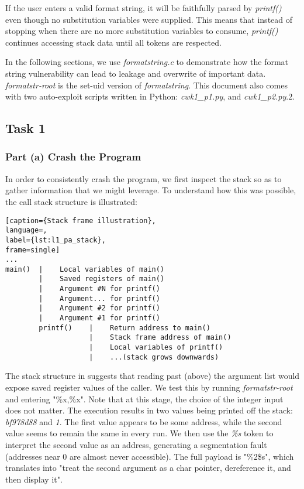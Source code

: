 If the user enters a valid format string, it will be faithfully parsed by \emph{printf()} even though no substitution variables were supplied. This means that instead of  stopping when there are no more substitution variables to consume, \emph{printf()} continues accessing stack data until all tokens are respected.

In the following sections, we use \emph{formatstring.c} to demonstrate how the format string vulnerability can lead to leakage and overwrite of important data. \emph{formatstr-root} is the set-uid version of \emph{formatstring}. This document also comes with two auto-exploit scripts written in Python: \emph{cwk1\_p1.py}, and \emph{cwk1\_p2.py}.2.

\subsection{Task 1}
\subsubsection{Part (a) Crash the Program}
In order to consistently crash the program, we first inspect the stack so as to gather information that we might leverage. To understand how this was possible, the call stack structure is illustrated:

\begin{minipage}{\linewidth}
\begin{lstlisting}[caption={Stack frame illustration},
language=,
label={lst:l1_pa_stack},
frame=single]
...
main()  |    Local variables of main()
        |    Saved registers of main()
        |    Argument #N for printf()
        |    Argument... for printf()
        |    Argument #2 for printf()
        |    Argument #1 for printf()
        printf()    |    Return address to main()
                    |    Stack frame address of main()
                    |    Local variables of printf()
                    |    ...(stack grows downwards)
\end{lstlisting}
\end{minipage}

The stack structure in  suggests that reading past (above) the argument list would expose saved register values of the caller. We test this by running \emph{formatstr-root} and entering "\%x,\%x". Note that at this stage, the choice of the integer input does not matter. The execution results in two values being printed off the stack: \emph{bf978d88} and \emph{1}. The first value appears to be some address, while the second value seems to remain the same in every run. We then use the \emph{\%s} token to interpret the second value as an address, generating a segmentation fault (addresses near 0 are almost never accessible). The full payload is "\%2\$s", which translates into "treat the second argument as a char pointer, dereference it, and then display it".

